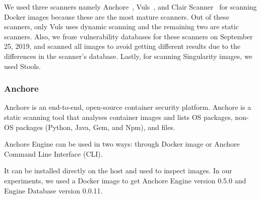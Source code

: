 \documentclass[a4paper,num-refs]{oup-contemporary}
\begin{document}


We used three scanners namely Anchore~\cite{github_2019}, Vuls~\cite{future-architect_2019}, and
Clair Scanner~\cite{arminc_2019} for scanning Docker images because these are the most
mature scanners. Out of these scanners, only Vuls uses dynamic scanning and the remaining two
are static scanners.
Also, we froze vulnerability databases for these scanners on September 25, 2019, and scanned
all images to avoid getting different results due to the differences in the scanner's database.
Lastly, for scanning Singularity images, we used Stools.

\subsubsection{Anchore}

Anchore is an end-to-end, open-source container security platform. Anchore
is a static
scanning tool that analyses container images and lists OS
packages, non-OS packages (Python, Java, Gem, and Npm), and files.

Anchore Engine can be used in two ways: through Docker image or Anchore
Command Line Interface (CLI).

It can be
installed directly on the host and used to inspect images.
In our experiments, we used a Docker image to get Anchore Engine version 0.5.0 and Engine Database
version 0.0.11.
\end{document}
